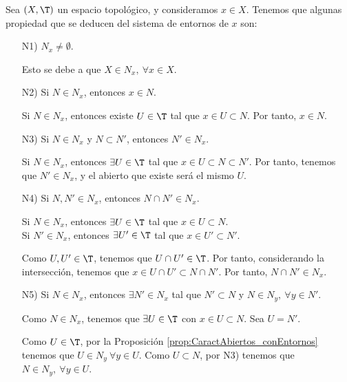 Sea $(X,\T)$ un espacio topológico, y consideramos $x\in X$. Tenemos que algunas propiedad que se deducen del sistema de entornos de $x$ son:
\begin{enumerate}
    \item[N1)] $N_x\neq \emptyset$.
    
    Esto se debe a que $X\in N_x,~\forall x\in X$.
    \item[N2)] Si $N\in N_x$, entonces $x\in N$.

    Si $N\in N_x$, entonces existe $U\in \T$ tal que $x\in U\subset N$. Por tanto, $x\in N$.
    
    \item[N3)] Si $N\in N_x$ y $N\subset N'$, entonces $N'\in N_x$.

    Si $N\in N_x$, entonces $\exists U\in \T$ tal que $x\in U\subset N\subset N'$. Por tanto, tenemos que $N'\in N_x$, y el abierto que existe será el mismo $U$.
    
    \item[N4)] Si $N,N'\in N_x$, entonces $N\cap N'\in N_x$.

    Si $N\in N_x$, entonces $\exists U\in \T$ tal que $x\in U\subset N$.\\
    Si $N'\in N_x$, entonces $\exists U'\in \T$ tal que $x\in U'\subset N'$.

    Como $U,U'\in \T$, tenemos que $U\cap U'\in \T$. Por tanto, considerando la intersección, tenemos que $x\in U\cap U'\subset N\cap N'$. Por tanto, $N\cap N'\in N_x$.
    
    \item[N5)] Si $N\in N_x$, entonces $\exists N'\in N_x$ tal que $N'\subset N$ y $N\in N_y,~\forall y\in N'$.

    Como $N\in N_x$, tenemos que $\exists U\in \T$ con $x\in U\subset N$. Sea $U=N'$.

    Como $U\in \T$, por la Proposición \ref{prop:CaractAbiertos_conEntornos} tenemos que $U\in N_y~\forall y\in U$. Como $U\subset N$, por N3) tenemos que $N\in N_y,~\forall y\in U$.
\end{enumerate}



